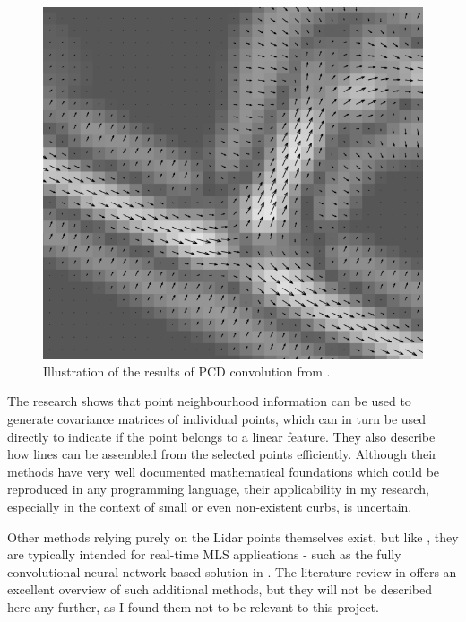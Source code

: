 \begin{figure}
    \includegraphics[width=\linewidth]{final_report/figs/clode_etal_2007_01.png} 
    \caption{Illustration of the results of PCD convolution from \cite{clode_etal_2007}.}
    \label{fig:phasecodeddisk}
\end{figure}

The research \cite{gross_thoennessen_2006} shows that point neighbourhood information can be used to generate covariance matrices of individual points, which can in turn be used directly to indicate if the point belongs to a linear feature. They also describe how lines can be assembled from the selected points efficiently. Although their methods have very well documented mathematical foundations which could be reproduced in any programming language, their applicability in my research, especially in the context of small or even non-existent curbs, is uncertain.

Other methods relying purely on the Lidar points themselves exist, but like \cite{zhang_2010}, they are typically intended for real-time MLS applications - such as the fully convolutional neural network-based solution in \cite{caltagirone_etal_2017}. The literature review in \cite{yang_etal_2013} offers an excellent overview of such additional methods, but they will not be described here any further, as I found them not to be relevant to this project.


